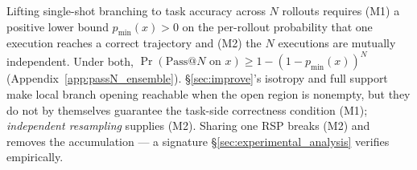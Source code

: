 Lifting single-shot branching to task accuracy across $N$ rollouts requires (M1) a positive lower bound $p_{\min}(x)>0$ on the per-rollout probability that one execution reaches a correct trajectory and (M2) the $N$ executions are mutually independent. Under both, $\Pr(\mathrm{Pass@}N \text{ on } x) \ge 1 - (1-p_{\min}(x))^N$ (Appendix~\ref{app:passN_ensemble}). \S\ref{sec:improve}'s isotropy and full support make local branch opening reachable when the open region is nonempty, but they do not by themselves guarantee the task-side correctness condition (M1); \emph{independent resampling} supplies (M2). Sharing one RSP breaks (M2) and removes the accumulation --- a signature \S\ref{sec:experimental_analysis} verifies empirically.
